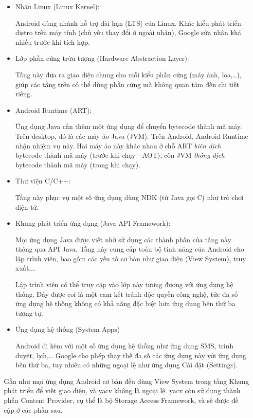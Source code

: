 \documentclass[
]{article}
\begin{document}
\begin{itemize}
\item
  Nhân Linux (Linux Kernel):

  Android dùng nhánh hỗ trợ dài hạn (LTS) của Linux. Khác kiểu phát
  triển distro trên máy tính (chủ yếu thay đổi ở ngoài nhân), Google sửa
  nhân khá nhiều trước khi tích hợp.
\item
  Lớp phần cứng trừu tượng (Hardware Abstraction Layer):

  Tầng này đưa ra giao diện chung cho mỗi kiểu phần cứng (máy ảnh,
  loa,\ldots), giúp các tầng trên có thể dùng phần cứng mà không quan
  tâm đến chi tiết riêng.
\item
  Android Runtime (ART):

  Ứng dụng Java cần thêm một ứng dụng để chuyển bytecode thành mã máy.
  Trên desktop, đó là các máy ảo Java (JVM). Trên Android, Android
  Runtime nhận nhiệm vụ này. Hai máy ảo này khác nhau ở chỗ ART
  \emph{biên dịch} bytecode thành mã máy (trước khi chạy - AOT), còn JVM
  \emph{thông dịch} bytecode thành mã máy (trong khi chạy).
\item
  Thư viện C/C++:

  Tầng này phục vụ một số ứng dụng dùng NDK (từ Java gọi C) như trò chơi
  điện tử.
\item
  Khung phát triển ứng dụng (Java API Framework):

  Mọi ứng dụng Java được viết nhờ sử dụng các thành phần của tầng này
  thông qua API Java. Tầng này cung cấp toàn bộ tính năng của Android
  cho lập trình viên, bao gồm các yếu tố cơ bản như giao diện (View
  System), truy xuất,\ldots{}

  Lập trình viên có thể truy cập vào lớp này tương đương với ứng dụng hệ
  thống. Đây được coi là một cam kết tránh độc quyền công nghệ, tức đa
  số ứng dụng hệ thống không có khả năng đặc biệt hơn ứng dụng bên thứ
  ba tương tự.
\item
  Ứng dụng hệ thống (System Apps)

  Android đi kèm với một số ứng dụng hệ thống như ứng dụng SMS, trình
  duyệt, lịch,\ldots{} Google cho phép thay thế đa số các ứng dụng này
  với ứng dụng bên thứ ba, tuy nhiên có những ngoại lệ như ứng dụng Cài
  đặt (Settings).
\end{itemize}

Gần như mọi ứng dụng Android cơ bản đều dùng View System trong tầng
Khung phát triển để viết giao diện, và yacv không là ngoại lệ. yacv còn
sử dụng thành phần Content Provider, cụ thể là bộ Storage Access
Framework, và sẽ được đề cập ở các phần sau.
\end{document}
